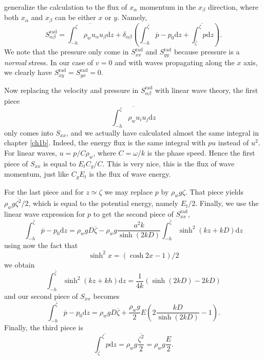 generalize the calculation to the flux of $x_\alpha$ momentum in the $x_\beta$ direction, where both 
$x_\alpha$ and $x_\beta$ can be either $x$ or $y$. Namely, 
\begin{equation}
    S^{\mathrm{rad}}_{\alpha \beta}=\overline{ \int_{-h}^\zeta \rho_w u_\alpha u_\beta \mathrm{d}z }
    +\delta_{\alpha \beta} \left(\int_{-h}^{\overline{\zeta}} \overline{ p} -p_0   \mathrm{d}z
    +\overline{ \int_{\overline{\zeta}}^\zeta p  \mathrm{d}z}\right).
\end{equation}
We note that the pressure only come in $S^{\mathrm{rad}}_{xx}$ and 
$S^{\mathrm{rad}}_{yy}$ because pressure is a \emph{normal} stress. In our case of  $v=0$ 
and with waves propagating along the $x$ axis, we clearly have  $S^{\mathrm{rad}}_{xy}=S^{\mathrm{rad}}_{yx}=0$.

Now replacing the velocity and pressure in  $S^{\mathrm{rad}}_{\alpha \beta}$
with linear wave theory, the first piece 
\begin{equation}
 \overline{ \int_{-h}^\zeta \rho_w u_i u_j \mathrm{d}z }
\end{equation}
only comes into $S_{xx}$, and we actually have calculated almost the same integral in chapter 
\ref{ch1b}. Indeed, the energy flux is the same integral with $pu$ instead of $u^2$. For linear waves, $u=p/C\rho_w$, 
where $C=\omega/k$ is the phase speed. Hence the first piece of $S_{xx}$ is equal to 
$E_t C_g/C$. This is very nice, this is the flux of wave momentum, just like $C_g E_t$ is the flux of wave energy. 

For the last piece and for $z \simeq \zeta$ we may replace $p$ by $\rho_w g \zeta$. That piece yields $\rho_w g
\overline{\zeta^2}/2$, which is equal to the potential energy, namely $E_t/2$. Finally, we use the linear wave 
expression for $p$ to get the second piece of $S^{\mathrm{rad}}_{xx}$, 
\begin{equation}
    \int_{-h}^{\overline{\zeta}} \overline{ p} -p_0   \mathrm{d}z
    =\rho_w g D \overline{\zeta} -
    \rho_w g\frac{a^2 k}{\sinh\left(2kD\right)}
    \int_{-h}^{\overline{\zeta}}  \sinh^2 \left(kz+kD\right) \mathrm{d}z
\end{equation}
using now the fact that 
\begin{equation}
\sinh^2 x=\left(\cosh 2x -1\right)/2
\end{equation}
we obtain
\begin{equation}
    \int_{-h}^{\overline{\zeta}}  \sinh^2\left(kz+kh\right) \mathrm{d}z = \frac{1}{4k}
        \left(\sinh\left(2kD\right) - 2kD \right)
\end{equation}
and our second piece of $S_{xx}$ becomes
\begin{equation}
    \int_{-h}^{\overline{\zeta}} \overline{ p} -p_0   \mathrm{d}z
    =\rho_w g D \overline{\zeta} + \frac{\rho_w g}{2}E
    \left(2 \frac{kD}{\sinh\left(2kD\right)} - 1 \right).
\end{equation}
Finally, the third piece is 
\begin{equation}
 \overline{ \int_{{\overline{\zeta}}}^\zeta p  \mathrm{d}z} = \rho_w g  \overline{ \frac{\zeta^2}{2}
 }=\rho_w g \frac{E}{2}.
\end{equation}


